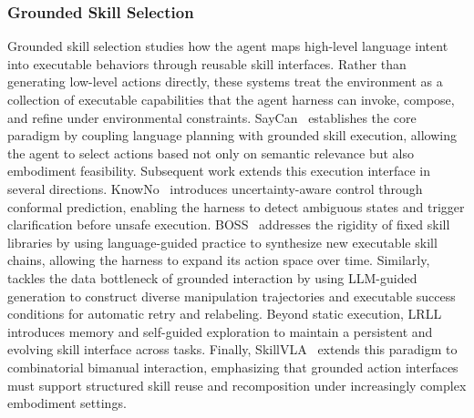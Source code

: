\documentclass{llmxive}
\begin{document}
\subsubsection{Grounded Skill Selection}
Grounded skill selection studies how the agent maps high-level language intent into executable behaviors through reusable skill interfaces. Rather than generating low-level actions directly, these systems treat the environment as a collection of executable capabilities
that the agent harness can invoke, compose, and refine under environmental constraints. SayCan~\cite{ahn2022can} establishes the core paradigm by coupling language planning with grounded skill execution, allowing the agent to select actions based not only on semantic relevance but also embodiment feasibility.
Subsequent work extends this execution interface in several directions. KnowNo~\cite{ren2023robots} introduces uncertainty-aware control through conformal prediction, enabling the harness to detect ambiguous states and trigger clarification before unsafe
execution. BOSS~\cite{zhang2023bootstrap} addresses the rigidity of fixed skill libraries by using language-guided practice to synthesize
new executable skill chains, allowing the harness to expand its
action space over time.
Similarly, \cite{ha2023scaling} tackles the data bottleneck of
grounded interaction by using LLM-guided generation to construct
diverse manipulation trajectories and executable success
conditions for automatic retry and relabeling.
Beyond static execution, LRLL~\cite{tziafas2024lifelong}
introduces memory and self-guided exploration to maintain a
persistent and evolving skill interface across tasks.
Finally, SkillVLA~\cite{zhai2026skillvla} extends this paradigm
to combinatorial bimanual interaction, emphasizing that grounded
action interfaces must support structured skill reuse and
recomposition under increasingly complex embodiment settings.
\end{document}
